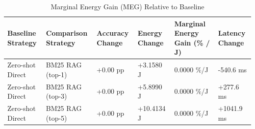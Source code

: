 \begin{table}
\caption{Marginal Energy Gain (MEG) Relative to Baseline}
\label{tab:marginal_energy_gain}
\begin{tabular}{llllll}
\toprule
Baseline Strategy & Comparison Strategy & Accuracy Change & Energy Change & Marginal Energy Gain (\% / J) & Latency Change \\
\midrule
Zero-shot Direct & BM25 RAG (top-1) & +0.00 pp & +3.1580 J & 0.0000 \%/J & -540.6 ms \\
Zero-shot Direct & BM25 RAG (top-3) & +0.00 pp & +5.8990 J & 0.0000 \%/J & +277.6 ms \\
Zero-shot Direct & BM25 RAG (top-5) & +0.00 pp & +10.4134 J & 0.0000 \%/J & +1041.9 ms \\
\bottomrule
\end{tabular}
\end{table}

